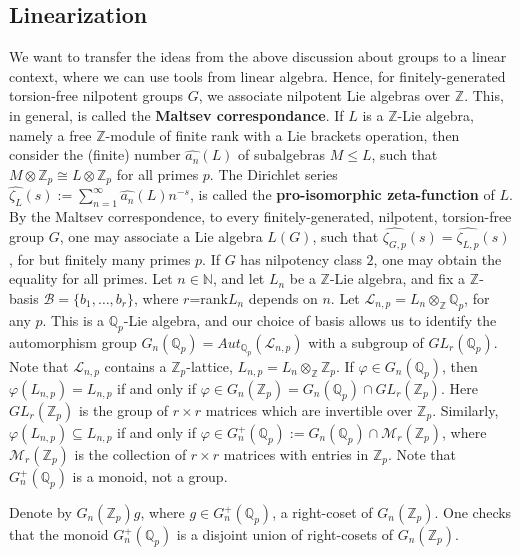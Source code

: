 \documentclass[12pt]{article}
\begin{document}
\subsection{Linearization}
We want to transfer the ideas from the above discussion about groups to a linear context, where we can use tools from linear algebra.
Hence, for finitely-generated torsion-free nilpotent groups $G$, we associate nilpotent Lie algebras over $\mathbb{Z}$. This, in general, is called the \textbf{Maltsev correspondance}. 
If $L$ is a $\mathbb{Z}$-Lie algebra, namely a free $\mathbb{Z}$-module of finite rank with a Lie brackets operation, then consider the (finite) number $\hat{a_n}(L)$ of subalgebras $M\leq L$, such that $M\otimes\mathbb{Z}_p\cong L\otimes\mathbb{Z}_p$ for all primes $p$. The Dirichlet series $\hat{\zeta_L}(s):=\sum_{n=1}^{\infty}\hat{a_n}(L)n^{-s}$, is called the \textbf{pro-isomorphic zeta-function} of $L$. By the Maltsev correspondence, to every finitely-generated, nilpotent, torsion-free group $G$, one may associate a Lie algebra $L(G)$, such that $\hat{\zeta_{G,p}}(s)=\hat{\zeta_{L,p}}(s)$, for but finitely many primes $p$. If $G$ has nilpotency class $2$, one may obtain the equality for all primes. Let $n\in\mathbb{N}$, and let $L_n$ be a $\mathbb{Z}$-Lie algebra, and fix a $\mathbb{Z}$-basis $\mathcal{B}=\{b_1,\dots,b_r\}$, where $r$=rank$L_n$ depends on $n$. Let $\mathcal{L}_{n,p}=L_n\otimes_{\mathbb{Z}}\mathbb{Q}_p$, for any $p$. This is a $\mathbb{Q}_p$-Lie algebra, and our choice of basis allows us to identify the automorphism group $G_n(\mathbb{Q}_p)=Aut_{\mathbb{Q}_p}(\mathcal{L}_{n,p})$ with a subgroup of $GL_r(\mathbb{Q}_p)$. Note that $\mathcal{L}_{n,p}$ contains a $\mathbb{Z}_p$-lattice, $L_{n,p}=L_n\otimes_{\mathbb{Z}}\mathbb{Z}_p$. If $\varphi\in G_n(\mathbb{Q}_p)$, then $\varphi(L_{n,p})=L_{n,p}$ if and only if $\varphi\in G_n(\mathbb{Z}_p)=G_n(\mathbb{Q}_p)\cap GL_r(\mathbb{Z}_p)$. Here $GL_r(\mathbb{Z}_p)$ is the group of $r\times r$ matrices which are invertible over $\mathbb{Z}_p$. Similarly, $\varphi(L_{n,p})\subseteq L_{n,p}$ if and only if $\varphi\in G^+_n(\mathbb{Q}_p):=G_n(\mathbb{Q}_p)\cap \mathcal{M}_r(\mathbb{Z}_p)$, where $\mathcal{M}_r(\mathbb{Z}_p)$ is the collection of $r\times r$ matrices with entries in $\mathbb{Z}_p$. Note that $G^+_n(\mathbb{Q}_p)$ is a monoid, not a group.\par
Denote by $G_n(\mathbb{Z}_p)g$, where $g\in G^+_n(\mathbb{Q}_p)$, a right-coset of $G_n(\mathbb{Z}_p)$. One checks that the monoid $G^+_n(\mathbb{Q}_p)$ is a disjoint union of right-cosets of $G_n(\mathbb{Z}_p)$.\par
\end{document}
